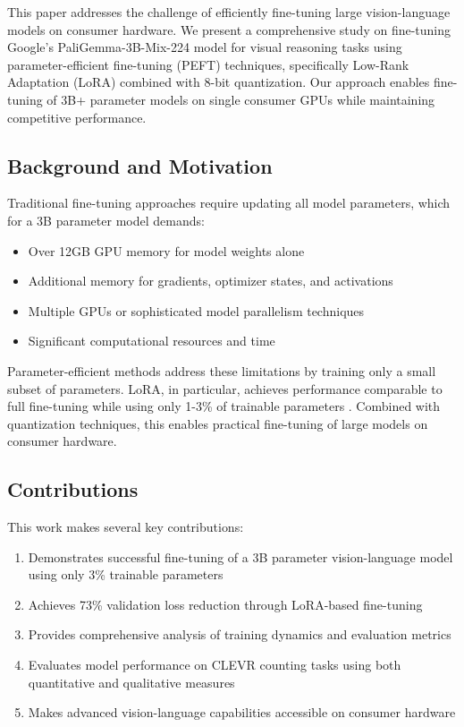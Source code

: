 \documentclass[conference]{IEEEtran}
\begin{document}
This paper addresses the challenge of efficiently fine-tuning large vision-language models on consumer hardware. We present a comprehensive study on fine-tuning Google's PaliGemma-3B-Mix-224 model for visual reasoning tasks using parameter-efficient fine-tuning (PEFT) techniques, specifically Low-Rank Adaptation (LoRA) combined with 8-bit quantization. Our approach enables fine-tuning of 3B+ parameter models on single consumer GPUs while maintaining competitive performance.

\subsection{Background and Motivation}

Traditional fine-tuning approaches require updating all model parameters, which for a 3B parameter model demands:
\begin{itemize}
    \item Over 12GB GPU memory for model weights alone
    \item Additional memory for gradients, optimizer states, and activations
    \item Multiple GPUs or sophisticated model parallelism techniques
    \item Significant computational resources and time
\end{itemize}

Parameter-efficient methods address these limitations by training only a small subset of parameters. LoRA, in particular, achieves performance comparable to full fine-tuning while using only 1-3\% of trainable parameters \cite{lora2021}. Combined with quantization techniques, this enables practical fine-tuning of large models on consumer hardware.

\subsection{Contributions}

This work makes several key contributions:
\begin{enumerate}
    \item Demonstrates successful fine-tuning of a 3B parameter vision-language model using only 3\% trainable parameters
    \item Achieves 73\% validation loss reduction through LoRA-based fine-tuning
    \item Provides comprehensive analysis of training dynamics and evaluation metrics
    \item Evaluates model performance on CLEVR counting tasks using both quantitative and qualitative measures
    \item Makes advanced vision-language capabilities accessible on consumer hardware
\end{enumerate}
\end{document}
